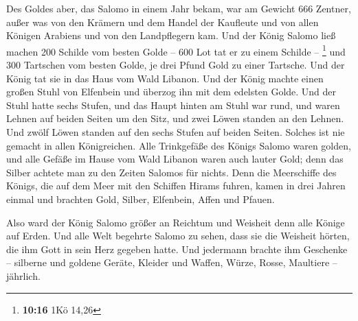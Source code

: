  Des Goldes aber, das Salomo in einem Jahr bekam, war am
Gewicht 666 Zentner,  außer was von den Krämern und dem
Handel der Kaufleute und von allen Königen Arabiens und von den
Landpflegern kam.  Und der König Salomo ließ machen 200
Schilde vom besten Golde -- 600 Lot tat er zu einem Schilde --
\footnote{\textbf{10:16} 1Kö 14,26}  und 300 Tartschen
vom besten Golde, je drei Pfund Gold zu einer Tartsche. Und der König
tat sie in das Haus vom Wald Libanon.  Und der König
machte einen großen Stuhl von Elfenbein und überzog ihn mit dem edelsten
Golde.  Und der Stuhl hatte sechs Stufen, und das Haupt
hinten am Stuhl war rund, und waren Lehnen auf beiden Seiten um den
Sitz, und zwei Löwen standen an den Lehnen.  Und zwölf
Löwen standen auf den sechs Stufen auf beiden Seiten. Solches ist nie
gemacht in allen Königreichen.  Alle Trinkgefäße des
Königs Salomo waren golden, und alle Gefäße im Hause vom Wald Libanon
waren auch lauter Gold; denn das Silber achtete man zu den Zeiten
Salomos für nichts.  Denn die Meerschiffe des Königs, die
auf dem Meer mit den Schiffen Hirams fuhren, kamen in drei Jahren einmal
und brachten Gold, Silber, Elfenbein, Affen und Pfauen.

 Also ward der König Salomo größer an Reichtum und
Weisheit denn alle Könige auf Erden.  Und alle Welt
begehrte Salomo zu sehen, dass sie die Weisheit hörten, die ihm Gott in
sein Herz gegeben hatte.  Und jedermann brachte ihm
Geschenke -- silberne und goldene Geräte, Kleider und Waffen, Würze,
Rosse, Maultiere -- jährlich.

